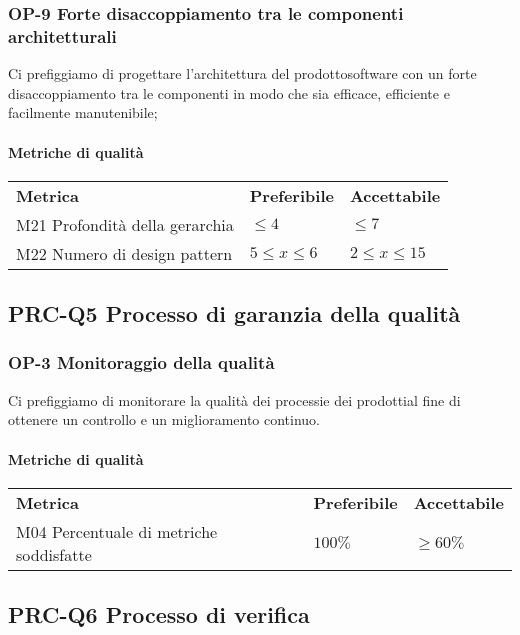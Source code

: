 		\subsubsection{OP-9 Forte disaccoppiamento tra le componenti architetturali}
		Ci prefiggiamo di progettare l'architettura del prodotto\glosp software con un forte disaccoppiamento tra le componenti in modo che sia efficace, efficiente e facilmente manutenibile;
		\paragraph{Metriche di qualità} \mbox{}
		\begin{longtable} {
				>{}p{80mm} 
				>{}p{25mm}
				>{}p{25mm}
			}
			\rowcolor{gray!50}
			\textbf{Metrica} & \textbf{Preferibile} & \textbf{Accettabile} \TBstrut \TBstrut \\
			M21 Profondità della gerarchia & $\le 4$ & $\le 7$ \TBstrut \\ [2mm]
			M22 Numero di design pattern & $5 \le x \le 6$ & $2 \le x \le 15$ \TBstrut \\ [2mm]
		\end{longtable}
			
	\subsection{PRC-Q5 Processo di garanzia della qualità}
		\subsubsection{OP-3 Monitoraggio della qualità}
			Ci prefiggiamo di monitorare la qualità dei processi\glosp e dei prodotti\glosp al fine di ottenere un controllo e un miglioramento continuo. 
			\paragraph{Metriche di qualità} \mbox{} 
			\begin{longtable} {
					>{}p{80mm} 
					>{}p{25mm}
					>{}p{25mm}
				}
				\rowcolor{gray!50}
				\textbf{Metrica} & \textbf{Preferibile} & \textbf{Accettabile} \TBstrut \TBstrut \\
				M04 Percentuale di metriche soddisfatte & $100\%$ & $\ge 60\%$ \TBstrut \\ [2mm]
			\end{longtable}

	\subsection{PRC-Q6 Processo di verifica}
